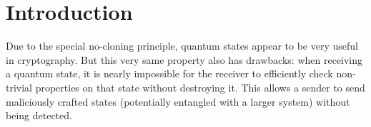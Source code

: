 \begin{abstract}


\end{abstract}
\arxivOnly{\newpage \tableofcontents}

\newpage

\section{Introduction}

Due to the special no-cloning principle, quantum states appear to be very useful in cryptography. But this very same property also has drawbacks: when receiving a quantum state, it is nearly impossible for the receiver to efficiently check non-trivial properties on that state without destroying it. This allows a sender to send maliciously crafted states (potentially entangled with a larger system) without being detected.

